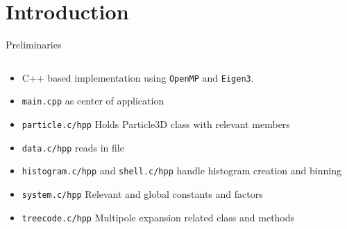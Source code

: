 \section{Introduction} %

\begin{frame}{Preliminaries}
	\begin{columns}[T] %
		\begin{column}{0.5\textwidth} %
			\begin{itemize}
				\item C++ based implementation using \texttt{OpenMP} and \texttt{Eigen3}.
				\item \texttt{main.cpp} as center of application
				\item \texttt{particle.c/hpp} Holds Particle3D class with relevant members
				\item \texttt{data.c/hpp} reads in file
				\item \texttt{histogram.c/hpp} and \texttt{shell.c/hpp} handle histogram creation and binning
				\item \texttt{system.c/hpp} Relevant and global constants and factors
				\item \texttt{treecode.c/hpp} Multipole expansion related class and methods
			\end{itemize}
		\end{column}


\end{columns}
\end{frame}
